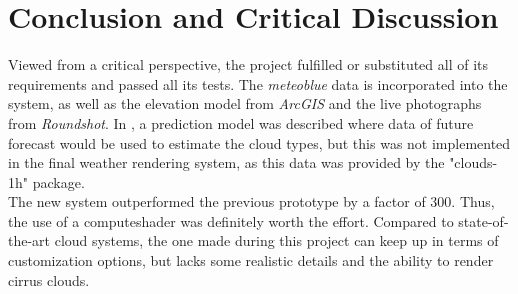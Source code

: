 \section{Conclusion and Critical Discussion}
\label{section:conclusion}
Viewed from a critical perspective, the project fulfilled or substituted all of its requirements and passed all its tests.
The \emph{meteoblue} data is incorporated into the system, as well as the elevation model from \emph{ArcGIS} and the live photographs from \emph{Roundshot}.
In , a prediction model was described where data of future forecast would be used to estimate the cloud types, but this was not implemented in the final weather rendering system, as this data was provided by the "clouds-1h" package.
\\
The new system outperformed the previous prototype by a factor of 300. Thus, the use of a \gls{computeshader} was definitely worth the effort.
Compared to state-of-the-art cloud systems, the one made during this project can keep up in terms of customization options, but lacks some realistic details and the ability to render cirrus clouds.
